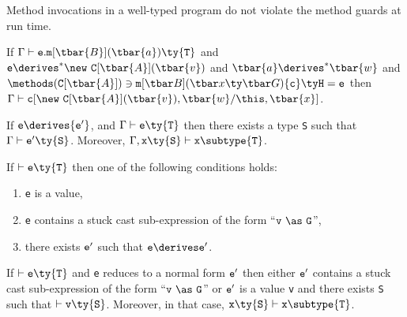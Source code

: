 
Method invocations in a well-typed program do not violate the method guards at run time.

\begin{theorem} If $\Gamma \vdash {\tt e}.{\tt m}[\tbar{B}](\tbar{a})\ty{\tt T}$ and ${\tt e} \derives^*	 \new~{\tt C}[\tbar{A}](\tbar{v})$ and $\tbar{a} \derives^* \tbar{w}$ and $\methods({\tt C}[\tbar{A}])\ni\minst{B}{x}{G}{c}{H}{e}$ then $\Gamma\vdash {\tt c}[\new~{\tt C}[\tbar{A}](\tbar{v}),\tbar{w}/\this,\tbar{x}]$.
\end{theorem}

\begin{lemma} If ${\tt e} \derives {\tt e'}$, and $\Gamma \vdash {\tt e}\ty{\tt T}$ then there exists a type {\tt S} such that $\Gamma\vdash{\tt e'}\ty{\tt S}$. Moreover, $\Gamma,{\tt x}\ty{\tt S} \vdash {\tt x}\subtype{\tt T}$.
\end{lemma}

\begin{lemma}[Progress]
If $\vdash {\tt e}\ty{\tt T}$ then one of the following conditions holds:
\begin{enumerate}
\item {\tt e} is a value,
\item {\tt e} contains a stuck cast sub-expression of the form ``${\tt v}~\as~{\tt G}$'',
\item there exists $\tt e'$ such that $\tt e\derives e'$.
\end{enumerate}
\end{lemma}

\begin{theorem}
If $\vdash {\tt e}\ty{\tt T}$ and {\tt e}
reduces to a normal form ${\tt e'}$ then either ${\tt e'}$ contains a stuck cast sub-expression of the form ``${\tt v}~\as~{\tt G}$'' or ${\tt e'}$ is a value {\tt v} and there exists {\tt S} such that $\vdash {\tt v}\ty{\tt S}$. Moreover, in that case, ${\tt x}\ty{\tt S}\vdash{\tt x}\subtype{\tt T}$.
\end{theorem}

